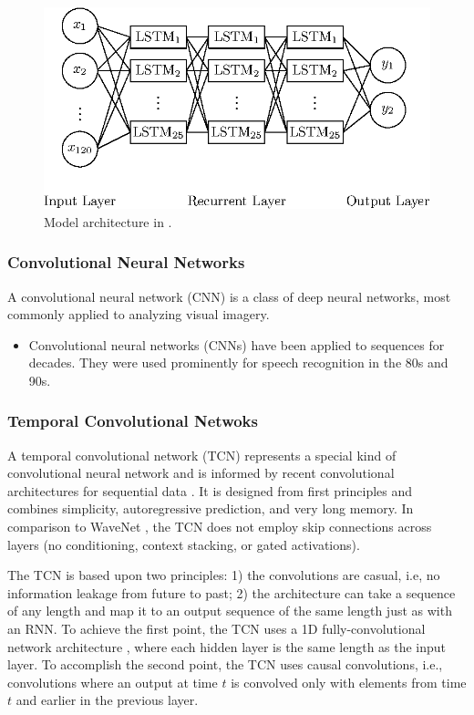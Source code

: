 \documentclass{scrartcl}
\begin{document}
\begin{figure}[htbp]
\centering
\includegraphics[scale=1.0]{figures/neural_network_boeck.eps}
\caption{Model architecture in \cite{Boeck2011}.}
\label{fig:}
\end{figure}    


\subsubsection{Convolutional Neural Networks}

A convolutional neural network (CNN) is a class of deep neural networks, most commonly applied to analyzing visual imagery.

\begin{itemize}
\item Convolutional neural networks (CNNs) \cite{LeCun1989} have been applied to sequences for decades. They were used prominently for speech recognition in the 80s and 90s.
\end{itemize}



\subsubsection{Temporal Convolutional Netwoks}

A temporal convolutional network (TCN)  represents a special kind of convolutional neural network and is informed by recent convolutional architectures for sequential data \cite{Bai2018}. It is designed from first principles and combines simplicity, autoregressive prediction, and very long memory. In comparison to WaveNet \cite{Oord2016}, the TCN does not employ skip connections across layers (no conditioning, context stacking, or gated activations).

The TCN is based upon two principles: 1) the convolutions are casual, i.e, no information leakage from future to past; 2) the architecture can take a sequence of any length and map it to an output sequence of the same length just as with an RNN. To achieve the first point, the TCN uses a 1D fully-convolutional network architecture \cite{Long2015}, where each hidden layer is the same length as the input layer. To accomplish the second point, the TCN uses causal convolutions, i.e., convolutions where an output at time $t$ is convolved only with elements from time $t$ and earlier in the previous layer.
\end{document}
